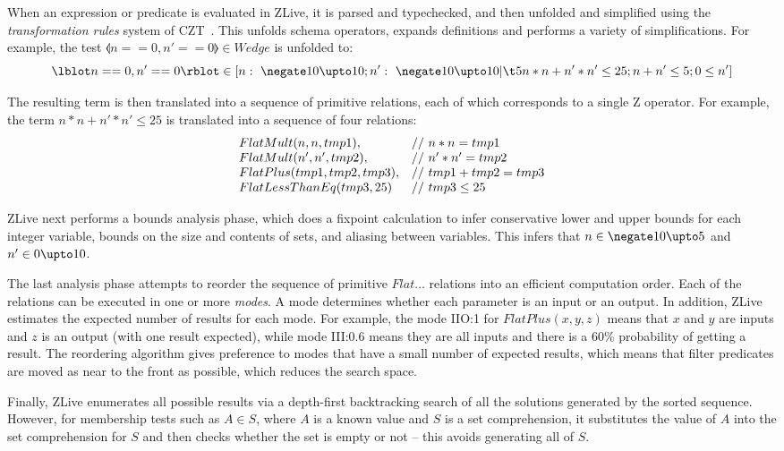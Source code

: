 \documentclass{llncs}
\begin{document}
When an expression or predicate is evaluated in ZLive, it is
parsed and typechecked, and then unfolded and simplified using
the \emph{transformation rules} system of CZT~\cite{utting:rules07}.
This unfolds schema operators, expands definitions and performs a
variety of simplifications.  For example, the test $\lblot n==0, n'==0
\rblot \in Wedge$ is unfolded to:
\[
  \lblot n == 0 , n' == 0 \rblot \in
 [ n :~\negate 10 \upto 10; n' :~\negate 10 \upto 10 | \\
   \t5 n * n + n' * n'  \leq 25; n + n' \leq 5; 0 \leq n' ]
\]

The resulting term is then translated into a sequence of primitive
relations, each of which corresponds to a single Z operator.
For example, the term $n * n + n' * n'  \leq 25$ is
translated into a sequence of four relations:
\[
\begin{array}{l@{\quad}l}
   FlatMult(n, n, tmp1),       & //~ n * n = tmp1 \\
   FlatMult(n', n', tmp2),     & //~ n' * n' = tmp2 \\
   FlatPlus(tmp1, tmp2, tmp3), & //~ tmp1 + tmp2 = tmp3 \\
   FlatLessThanEq(tmp3, 25)    & //~ tmp3 \leq 25
\end{array}
\]

ZLive next performs a bounds analysis phase, which does a fixpoint
calculation to infer conservative lower and upper bounds for each
integer variable, bounds on the size and contents of sets, and
aliasing between variables.  This infers that $n \in \negate 10 \upto
5$ and $n' \in 0 \upto 10$.

The last analysis phase attempts to reorder the sequence of primitive
$Flat\ldots$ relations into an efficient computation order.  Each of
the relations can be executed in one or more \emph{modes}.  A mode
determines whether each parameter is an input or an output.  In
addition, ZLive estimates the expected number of results for each
mode.  For example, the mode IIO:1 for $FlatPlus(x,y,z)$ means that
$x$ and $y$ are inputs and $z$ is an output (with one result
expected), while mode III:0.6 means they are all inputs and there is a
60\% probability of getting a result.  The reordering algorithm gives
preference to modes that have a small number of expected results,
which means that filter predicates are moved as near to the front as
possible, which reduces the search space.

Finally, ZLive enumerates all possible results via a depth-first
backtracking search of all the solutions generated by the sorted sequence.
However, for membership tests such as $A \in S$, where $A$ is a known
value and $S$ is a set comprehension, it substitutes the value of $A$
into the set comprehension for $S$ and then checks whether the set is
empty or not -- this avoids generating all of $S$.
\end{document}
